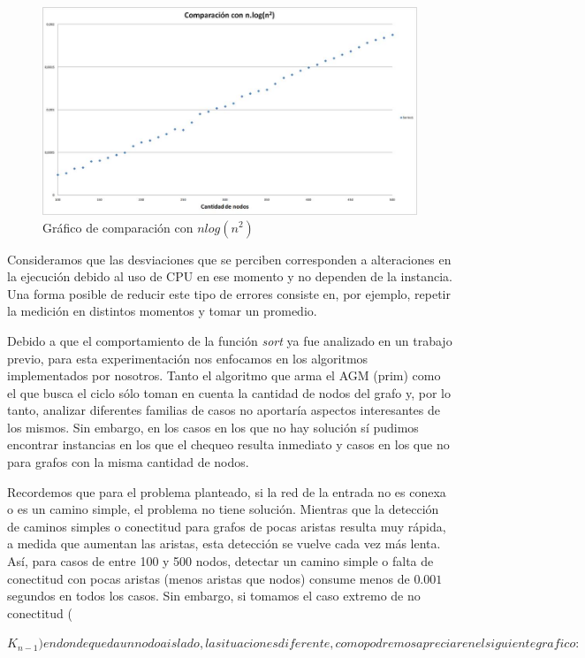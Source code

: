 \documentclass[11pt, a4paper, twoside]{article}
\begin{document}
\begin{figure}[H]
\centering
\includegraphics[scale=0.5]{imagenes/graph1.jpg}
\caption{Gráfico de comparación con $nlog(n^2)$}
\end{figure}

Consideramos que las desviaciones que se perciben corresponden a alteraciones en la ejecución debido al uso de CPU en ese momento y no dependen de la instancia. Una forma posible de reducir este tipo de errores consiste en, por ejemplo, repetir la medición en distintos momentos y tomar un promedio.

Debido a que el comportamiento de la función \textit{sort} ya fue analizado en un trabajo previo, para esta experimentación nos enfocamos en los algoritmos implementados por nosotros. Tanto el algoritmo que arma el AGM (prim) como el que busca el ciclo sólo toman en cuenta la cantidad de nodos del grafo y, por lo tanto, analizar diferentes familias de casos no aportaría aspectos interesantes de los mismos. Sin embargo, en los casos en los que no hay solución sí pudimos encontrar instancias en los que el chequeo resulta inmediato y casos en los que no para grafos con la misma cantidad de nodos. 

Recordemos que para el problema planteado, si la red de la entrada no es conexa o es un camino simple, el problema no tiene solución. Mientras que la detección de caminos simples o conectitud para grafos de pocas aristas resulta muy rápida, a medida que aumentan las aristas, esta detección se vuelve cada vez más lenta. Así, para casos de entre 100 y 500 nodos, detectar un camino simple o  falta de conectitud con pocas aristas (menos aristas que nodos) consume menos de $0.001$ segundos en todos los casos. Sin embargo, si tomamos el caso extremo de no conectitud (

$K_{n-1}) en donde queda un nodo aislado, la situacion es diferente, como podremos apreciar en el siguiente grafico:$
\end{document}
